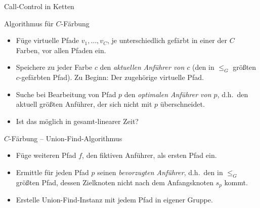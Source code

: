 \begin{section}{Call-Control in Ketten}
\begin{frame}{Algorithmus für $C$-Färbung}
		
	\begin{itemize}
		\pause\item Füge virtuelle Pfade $v_1,\dots,v_C$, je unterschiedlich gefärbt in einer der $C$ Farben, vor allen Pfaden ein.
		\pause\item Speichere zu jeder Farbe $c$ den {\em aktuellen Anführer von $c$} (den in $\leq_G$ größten $c$-gefärbten Pfad). Zu Beginn: Der zugehörige virtuelle Pfad.
		\begin{figure}[htbp]
			\centering
			\tiny
			\def\svgwidth{200bp}
			
		\end{figure}
		\pause\item Suche bei Bearbeitung von Pfad $p$ den {\em optimalen Anführer von $p$}, d.h.\ den aktuell größten Anführer, der sich nicht mit $p$ überschneidet.
		\pause\item Ist das möglich in gesamt-linearer Zeit?
	\end{itemize}

\end{frame}

\begin{frame}{$C$-Färbung -- Union-Find-Algorithmus}
	\begin{itemize}
		\pause\item Füge weiteren Pfad $f$, den fiktiven Anführer, als ersten Pfad ein.
		\pause\item Ermittle für jeden Pfad $p$ seinen {\em bevorzugten Anführer}, d.h.\ den in $\leq_G$ größten Pfad, dessen Zielknoten nicht nach dem Anfangsknoten $s_p$ kommt.
		\pause\begin{figure}[htbp]
			\centering
			\small
			\def\svgwidth{180bp}
			
		\end{figure}
		\pause\item Erstelle Union-Find-Instanz mit jedem Pfad in eigener Gruppe.
	\end{itemize}
\end{frame}


\end{section}

